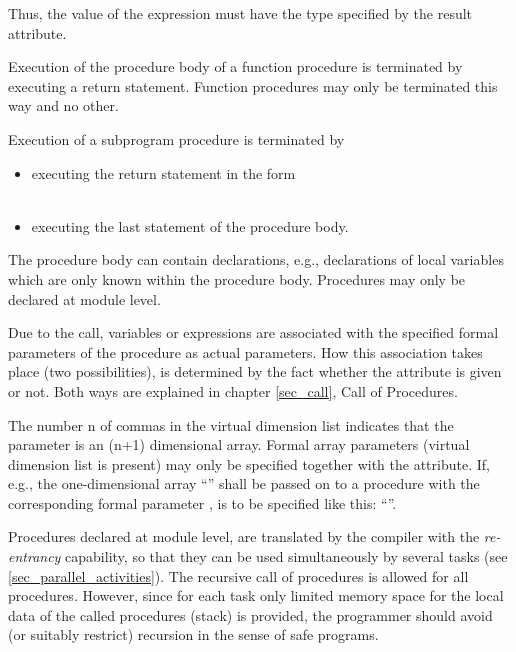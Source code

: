 \begin{grammarframe}
\end{grammarframe}

Thus, the value of the expression must have the type specified by the
result attribute.

Execution of the procedure body of a function procedure is terminated by
executing a return statement. Function procedures may only be terminated
this way and no other.

Execution of a subprogram procedure is terminated by
\begin{itemize}
\item executing the return statement in the form\\
      \\
\item executing the last statement of the procedure body.
\end{itemize}

The procedure body can contain declarations, e.g., declarations of local
variables which are only known within the procedure body. 
Procedures may only be declared at module level.

Due to the call, variables or expressions are associated with the
specified formal parameters of the procedure as actual parameters. How
this association takes place (two possibilities), is determined by the
fact whether the attribute  is given or not. Both ways are
explained in chapter \ref{sec_call}, Call of Procedures.

The number n of commas in the virtual dimension list indicates that the
parameter is an (n+1) dimensional array. Formal array parameters
(virtual dimension list is present) may only be specified together with
the  attribute. If, e.g., the one-dimensional array 
``'' shall be passed on to a procedure 
 with the corresponding
formal parameter ,  is to be specified like this:
 ``''.

Procedures declared at module level, are translated by the compiler with
the {\em re-entrancy} capability, so that they can be used
simultaneously by several tasks (see \ref{sec_parallel_activities}).
 The recursive call of
procedures is allowed for all
procedures.
However, since for each task only limited memory space for the local
data of the called procedures (stack) is provided, the programmer
should avoid (or suitably restrict) recursion in the sense of safe
programs.


